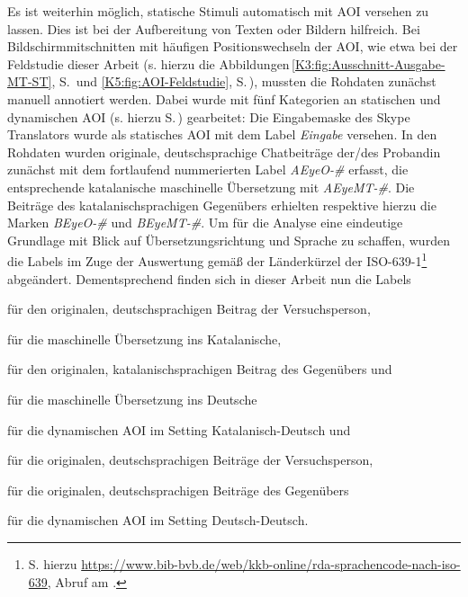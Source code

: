 Es ist weiterhin möglich, statische Stimuli automatisch mit AOI versehen zu lassen. Dies ist bei der Aufbereitung von Texten oder Bildern hilfreich. Bei Bildschirmmitschnitten mit häufigen Positionswechseln der AOI, wie etwa bei der Feldstudie dieser Arbeit (s. hierzu die Abbildungen\,\ref{K3:fig:Ausschnitt-Ausgabe-MT-ST}, S.\,\pageref{K3:fig:Ausschnitt-Ausgabe-MT-ST} und \ref{K5:fig:AOI-Feldstudie}, S.\,\pageref{K5:fig:AOI-Feldstudie}), mussten die Rohdaten zunächst manuell annotiert werden. Dabei wurde mit fünf Kategorien an statischen und dynamischen AOI (s. hierzu S.\,\pageref{K5:subsubsec:DynAOI}) gearbeitet: Die Eingabemaske des Skype Translators wurde als statisches AOI mit dem Label \emph{Eingabe} versehen. In den Rohdaten wurden originale, deutschsprachige Chatbeiträge der/des Proband{\textperiodcentered}in zunächst mit dem fortlaufend nummerierten Label \emph{AEyeO-\#} erfasst, die entsprechende katalanische maschinelle Übersetzung mit \emph{AEyeMT-\#}. Die Beiträge des katalanischsprachigen Gegenübers erhielten respektive hierzu die Marken \emph{BEyeO-\#} und \emph{BEyeMT-\#}. Um für die Analyse eine eindeutige Grundlage mit Blick auf Übersetzungsrichtung und Sprache zu schaffen, wurden die Labels im Zuge der Auswertung gemäß der Länderkürzel der ISO-639-1\footnote{S. hierzu \url{https://www.bib-bvb.de/web/kkb-online/rda-sprachencode-nach-iso-639}, Abruf am \datum{}.} abgeändert. Dementsprechend finden sich in dieser Arbeit nun die Labels \label{K5:itemize:labelnamen}

\begin{description}[font=\normalfont\scshape]
    \item [GerO] für den originalen, deutschsprachigen Beitrag der Versuchsperson,
    \item [CatMT] für die maschinelle Übersetzung ins Katalanische, 
    \item [CatO] für den originalen, katalanischsprachigen Beitrag des Gegenübers und
    \item [GerMT] für die maschinelle Übersetzung ins Deutsche
\end{description}
für die dynamischen AOI im Setting Katalanisch-Deutsch und

\begin{description}[font=\normalfont]
    \item[A] für die originalen, deutschsprachigen Beiträge der Versuchsperson,
    \item[B] für die originalen, deutschsprachigen Beiträge des Gegenübers 
\end{description}
für die dynamischen AOI im Setting Deutsch-Deutsch.

